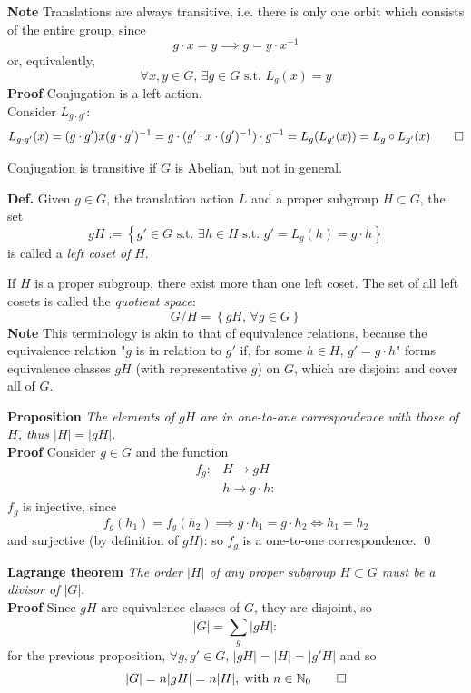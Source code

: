 
\textbf{Note} Translations are always transitive, i.e. there is only
one orbit which consists of the entire group, since
$$g\cdot x=y\implies g = y\cdot x^{-1}$$
or, equivalently,
$$\forall x,y\in G,\,\exists g\in G\text{ s.t. }L_g(x)=y$$
\textbf{Proof} Conjugation is a left action.\\
Consider $L_{g\cdot g'}$:
$$L_{g\cdot g'}(x) = (g\cdot g')x(g\cdot g')^{-1} = 
g\cdot(g'\cdot x \cdot (g')^{-1})\cdot g^{-1} = L_g(L_{g'}(x)) = L_g\circ L_{g'}
(x)\qed$$

Conjugation is transitive if $G$ is Abelian, but not in general.

\textbf{Def.} Given $g\in G$, the translation action $L$ and a proper
subgroup $H\subset G$, the set
$$gH := \left\{g'\in G\text{ s.t. }\exists h\in H\text{ s.t. }g'=L_g(h)=g\cdot h
\right\}$$
is called a \textit{left coset of} $H$.

If $H$ is a proper subgroup, there exist more than one left coset. The set of
all left cosets is called the \textit{quotient space}:
$$G/H = \left\{gH,\,\forall g\in G\right\}$$
\textbf{Note} This terminology is akin to that of equivalence relations, because
the equivalence relation "$g$ is in relation to $g'$ if, for some $h\in H$,
$g'=g\cdot h$" forms equivalence classes $gH$ (with representative $g$) on $G$,
which are disjoint and cover all of $G$.

\textbf{Proposition} \textit{The elements of $gH$ are in one-to-one correspondence
with those of $H$, thus $|H|=|gH|$}.\\
\textbf{Proof} Consider $g\in G$ and the function
\begin{align*}
    f_g:&H\to gH\\
        &h\to g\cdot h:
\end{align*}
$f_g$ is injective, since
$$f_g(h_1)=f_g(h_2) \implies g\cdot h_1 = g\cdot h_2 \iff h_1 = h_2$$
and surjective (by definition of $gH$): so $f_g$ is a one-to-one correspondence.
\qed

\textbf{Lagrange theorem} \textit{The order $|H|$ of any proper subgroup
$H\subset G$ must be a divisor of $|G|$}.\\
\textbf{Proof} Since $gH$ are equivalence classes of $G$, they are disjoint, so
$$|G| = \sum_{g}^{}|gH|:$$
for the previous proposition, $\forall g,g'\in G,\,|gH|=|H|=|g'H|$ and so
$$|G|=n|gH| = n|H|,\;\text{with }n\in\mathbb{N}_0 \qed$$
